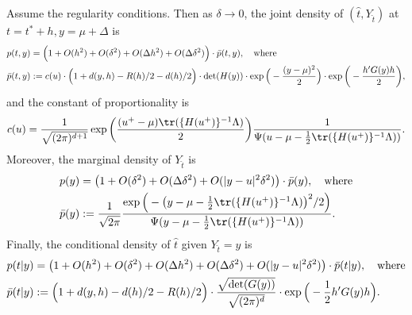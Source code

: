 \documentclass{article}
\begin{document}
\begin{theorem}
	\label{thm:approximate-joint-distribution}
	Assume the regularity conditions. Then as $\delta \to 0$, the joint density of $(\hat{t},Y_{\hat{t}})$ at $t = t^* + h,y = \mu + \Delta$ is
	\begin{equation}
		\label{eqn:approximate-joint-density}
		\begin{aligned}
			p(t,y) & = \Big(1 + O(h^2) + O(\delta^2) + O(\Delta h^2) + O(\Delta\delta^2)\Big) \cdot \bar{p}(t,y), \quad {\rm where} \\
			\bar{p}(t,y) & := c(u) \cdot\Big(1 + d(y,h) - R(h)/2 - d(h)/2\Big) \cdot \det(H(y)) \cdot \exp\Big(-\frac{(y - \mu)^2}{2}\Big) \cdot \exp\bigg(-\frac{h' G(y)h}{2}\bigg),
		\end{aligned}
	\end{equation}
	and the constant of proportionality is
	\begin{equation}
		\label{eqn:approximate-joint-density-constant-of-proportionality}
		c(u) = \frac{1}{\sqrt{(2\pi)^{d + 1}}} \exp\bigg(\frac{(u^+ - \mu)\tr(\{H(u^{+})\}^{-1}\Lambda)}{2}\bigg)
		\frac{1}{\Psi(u - \mu - \frac{1}{2}\tr(\{H(u^{+})\}^{-1}\Lambda))}.
	\end{equation}
	Moreover, the marginal density of $Y_{\hat{t}}$ is 
	\begin{equation}
		\label{eqn:approximate-marginal-density-height}
		\begin{aligned}
			p(y) & = \big(1 + O(\delta^2) + O(\Delta \delta^2) + O(|y - u|^2 \delta^2)\big) \cdot \bar{p}(y), \quad {\rm where} \\ 
			\bar{p}(y) & := \frac{1}{\sqrt{2\pi}}\frac{\exp\Big(-\big(y - \mu - \frac{1}{2}\tr(\{H(u^+)\}^{-1}\Lambda)\big)^2/2\Big) }{\Psi(y - \mu - \frac{1}{2}\tr(\{H(u^+)\}^{-1}\Lambda))}.
		\end{aligned}
	\end{equation}
	Finally, the conditional density of $\hat{t}$ given $Y_{\hat{t}} = y$ is 
	\begin{equation}
		\label{eqn:approximate-conditional-density-location}
		\begin{aligned}
			p(t|y) & = \big(1 + O(h^2) + O(\delta^2) + O(\Delta h^2) + O(\Delta\delta^2) + O(|y - u|^2 \delta^2)\big) \cdot \bar{p}(t|y), \quad {\rm where} \\
			\bar{p}(t|y) & := \Big(1 + d(y,h) - d(h)/2 - R(h)/2\Big) \cdot \frac{\sqrt{\det(G(y))}}{\sqrt{(2\pi)^d}} \cdot \exp\Big(-\frac{1}{2}h'G(y) h\Big).
		\end{aligned}
	\end{equation}
\end{theorem}
\end{document}
